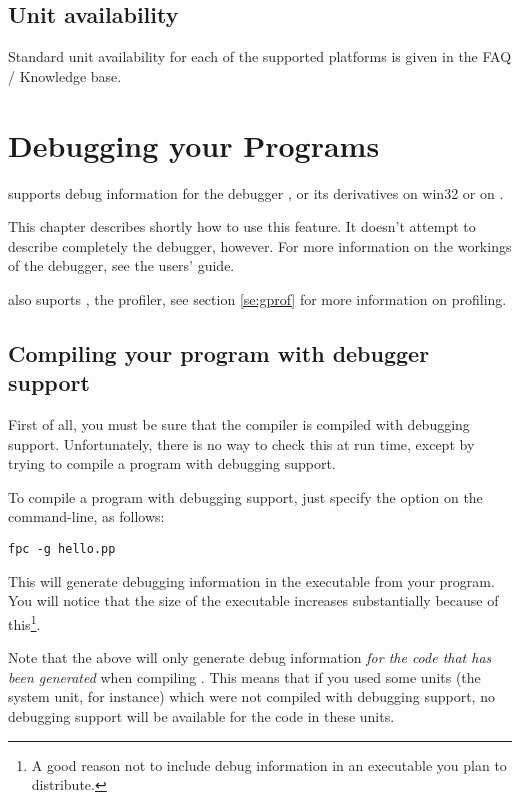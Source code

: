 \section{Unit availability}

Standard unit availability for each of the supported platforms 
is given in the FAQ / Knowledge base. 


\chapter{Debugging your Programs}

\fpc supports debug information for the \gnu debugger , or
its derivatives  on win32 or  on \linux.

This chapter describes shortly how to use this feature. It doesn't attempt
to describe completely the \gnu debugger, however.
For more information on the workings of the \gnu debugger, see the 
users' guide.

\fpc also suports , the \gnu profiler, see section \ref{se:gprof}
for more information on profiling.

\section{Compiling your program with debugger support}
First of all, you must be sure that the compiler is compiled with debugging
support. Unfortunately, there is no way to check this at run time, except by
trying to compile a program with debugging support.

To compile a program with debugging support, just specify the 
option on the command-line, as follows:
\begin{verbatim}
fpc -g hello.pp
\end{verbatim}
This will generate debugging information in the executable from your
program. You will notice that the size of the executable increases
substantially because of this\footnote{A good reason not to include debug
information in an executable you plan to distribute.}.

Note that the above will only generate debug information {\em for the code
that has been generated} when compiling . This means that if
you used some units (the system unit, for instance) which were not compiled
with debugging support, no debugging support will be available for the code
in these units.


